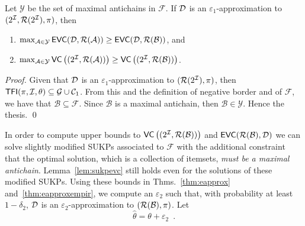 \begin{lemma}\label{lem:antichains}
  Let $\mathcal{Y}$ be the set of maximal antichains in $\mathcal{F}$. If
  ${\cal D}$ is an $\varepsilon_1$-approximation to $(2^{\cal I},\mathcal{R}(2^{\cal I}),\pi)$, then
  \begin{enumerate}
    \item
      $\max_{\mathcal{A}\in\mathcal{Y}}\mathsf{EVC}({\cal D},\mathcal{R}(\mathcal{A}))\ge\mathsf{EVC}({\cal D},\mathcal{R}(\mathcal{B}))$,
      and
    \item
      $\max_{\mathcal{A}\in\mathcal{Y}}\mathsf{VC}\left((2^{\cal I},\mathcal{R}(\mathcal{A}))\right)\ge\mathsf{VC}\left((2^{\cal I},\mathcal{R}(\mathcal{B}))\right)$.
  \end{enumerate}
\end{lemma}
\ifarxiv
\begin{proof}
  Given %
  that ${\cal D}$ is an $\varepsilon_1$-approximation to $(\mathcal{R}(2^{\cal I}),\pi)$, %
  then %
  $\mathsf{TFI}(\pi,{\cal I},\theta)\subseteq\mathcal{G}\cup\mathcal{C}_1$. 
  From this and
  the definition of negative border and of $\mathcal{F}$, we have that
  $\mathcal{B}\subseteq\mathcal{F}$. Since $\mathcal{B}$ is a maximal
  antichain, then $\mathcal{B}\in\mathcal{Y}$. Hence the thesis.
  \qed
\end{proof}
\fi

In order to compute upper bounds to
$\mathsf{VC}\left((2^{\cal I},\mathcal{R}(\mathcal{B}))\right)$ and
$\mathsf{EVC}(\mathcal{R}(\mathcal{B}),{\cal D})$ we can solve slightly modified SUKPs 
associated to $\mathcal{F}$ with the additional constraint that the
optimal solution, which is a collection of itemsets, \emph{must be a maximal
antichain}. Lemma~\ref{lem:sukpevc} still holds even for the solutions of these
modified SUKPs. Using these bounds in Thms.~\ref{thm:eapprox}
and~\ref{thm:eapproxempir}, we compute an $\varepsilon_2$ such that, with
probability at least $1-\delta_2$, ${\cal D}$ is an $\varepsilon_2$-approximation to
$(\mathcal{R}(\mathcal{B}),\pi)$. Let 
\[
\hat{\theta}=\theta+\varepsilon_2\enspace.\]



